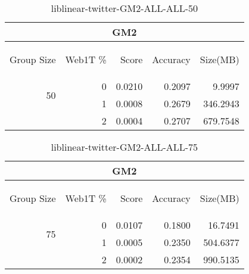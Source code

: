 \begin{center}
\begin{table}[htbp]
\begin{tabular}{ | r | r | r | r | r |}
\hline
\multicolumn{5}{|c|}{GM2}\\
\hline
\begin{sideways}Group Size\end{sideways} & \begin{sideways}Web1T \%\end{sideways} & \begin{sideways}Score\end{sideways} & \begin{sideways}Accuracy\end{sideways} & \begin{sideways}Size(MB)\end{sideways}\\
\hline
\multirow{2}{*}{50}
 & 0 & 0.0210 & 0.2097 & 9.9997\\ \cline{2-5}
 & 1 & 0.0008 & 0.2679 & 346.2943\\ \cline{2-5}
 & 2 & 0.0004 & 0.2707 & 679.7548\\ \cline{2-5}
\hline
\end{tabular}
\caption{liblinear-twitter-GM2-ALL-ALL-50}
\label{table:liblinear-twitter-GM2-ALL-ALL-50}
\end{table}
\end{center}

\begin{center}
\begin{table}[htbp]
\begin{tabular}{ | r | r | r | r | r |}
\hline
\multicolumn{5}{|c|}{GM2}\\
\hline
\begin{sideways}Group Size\end{sideways} & \begin{sideways}Web1T \%\end{sideways} & \begin{sideways}Score\end{sideways} & \begin{sideways}Accuracy\end{sideways} & \begin{sideways}Size(MB)\end{sideways}\\
\hline
\multirow{2}{*}{75}
 & 0 & 0.0107 & 0.1800 & 16.7491\\ \cline{2-5}
 & 1 & 0.0005 & 0.2350 & 504.6377\\ \cline{2-5}
 & 2 & 0.0002 & 0.2354 & 990.5135\\ \cline{2-5}
\hline
\end{tabular}
\caption{liblinear-twitter-GM2-ALL-ALL-75}
\label{table:liblinear-twitter-GM2-ALL-ALL-75}
\end{table}
\end{center}

